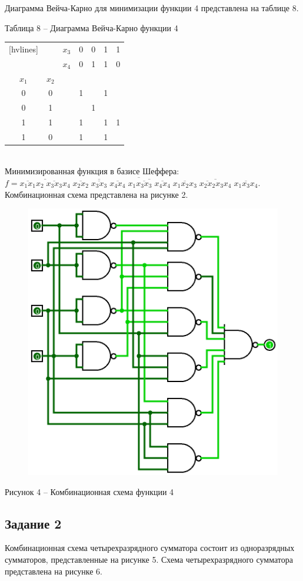 \documentclass[a4paper,14pt]{extarticle}
\begin{document}
	\pagebreak
	Диаграмма Вейча-Карно для минимизации функции 4 представлена на таблице 8.
	
	\noindent Таблица 8 -- Диаграмма Вейча-Карно функции 4 \\
	\begin{NiceTabular}{ccccccc}[hvlines]
		& & $x_3$ & 0 & 0 & 1 & 1 \\
		& & $x_4$ & 0 & 1 & 1 & 0 \\
		$x_1$ & $x_2$ & & & & & \\
		0 & 0 & & 1 & & 1 & \\
		0 & 1 & & & 1 & & \\
		1 & 1 & & 1 & & 1 & 1 \\
		1 & 0 & & 1 & & 1 & \\
	\end{NiceTabular} \\
	
	Минимизированная функция в базисе Шеффера:\\
	$f=\overline{
		\overline{\overline{x_1x_1}x_2\;\overline{x_3x_3}x_4}\;
		\overline{\overline{x_2x_2}\;\overline{x_3x_3}\;\overline{x_4x_4}}\;
		\overline{x_1\overline{x_3x_3}\;\overline{x_4x_4}}\;
		\overline{x_1x_2x_3}\;
		\overline{\overline{x_2x_2}x_3x_4}\;
		\overline{x_1x_3x_4}
	}$. Комбинационная схема представлена на рисунке 2.
	
	\begin{figure}[h]
		\centering
		\includegraphics[width=0.5\linewidth]{images/s-1-4}
	\end{figure}
	\begin{center}
		Рисунок 4 – Комбинационная схема функции 4
	\end{center}
	
	\newpage
	\subsection*{Задание 2}
	Комбинационная схема четырехразрядного сумматора состоит из одноразрядных сумматоров, представленные на рисунке 5. Схема четырехразрядного сумматора представлена на рисунке 6.
	
\end{document}
